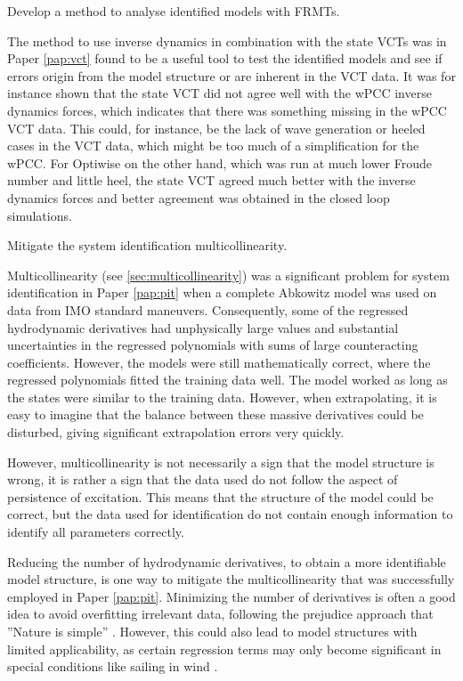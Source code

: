\begin{tcolorbox}[sharp corners,title=RO3]
Develop a method to analyse identified models with FRMTs.
\end{tcolorbox}
The method to use inverse dynamics in combination with the state VCTs was in Paper \ref{pap:vct} found to be a useful tool to test the identified models and see if errors origin from the model structure or are inherent in the VCT data. It was for instance shown that the state VCT did not agree well with the wPCC inverse dynamics forces, which indicates that there was something missing in the wPCC VCT data. This could, for instance, be the lack of wave generation or heeled cases in the VCT data, which might be too much of a simplification for the wPCC. For Optiwise on the other hand, which was run at much lower Froude number and little heel, the state VCT agreed much better with the inverse dynamics forces and better agreement was obtained in the closed loop simulations.

\begin{tcolorbox}[sharp corners,title=RO4]
Mitigate the system identification multicollinearity.
\end{tcolorbox}
Multicollinearity (see \autoref{sec:multicollinearity}) was a significant problem for system identification in Paper \ref{pap:pit} when a complete Abkowitz model was used on data from IMO standard maneuvers. Consequently, some of the regressed hydrodynamic derivatives had unphysically large values and substantial uncertainties in the regressed polynomials with sums of large counteracting coefficients. However, the models were still mathematically correct, where the regressed polynomials fitted the training data well. The model worked as long as the states were similar to the training data. However, when extrapolating, it is easy to imagine that the balance between these massive derivatives could be disturbed, giving significant extrapolation errors very quickly.

However, multicollinearity is not necessarily a sign that the model structure is wrong, it is rather a sign that the data used do not follow the aspect of persistence of excitation. This means that the structure of the model could be correct, but the data used for identification do not contain enough information to identify all parameters correctly.

Reducing the number of hydrodynamic derivatives, to obtain a more identifiable model structure, is one way to mitigate the multicollinearity that was successfully employed in Paper \ref{pap:pit}. Minimizing the number of derivatives is often a good idea to avoid overfitting irrelevant data, following the prejudice approach that ''Nature is simple'' \cite{ljung_perspectives_2010}. However, this could also lead to model structures with limited applicability, as certain regression terms may only become significant in special conditions like sailing in wind \cite{abkowitz_measurement_1980}.

